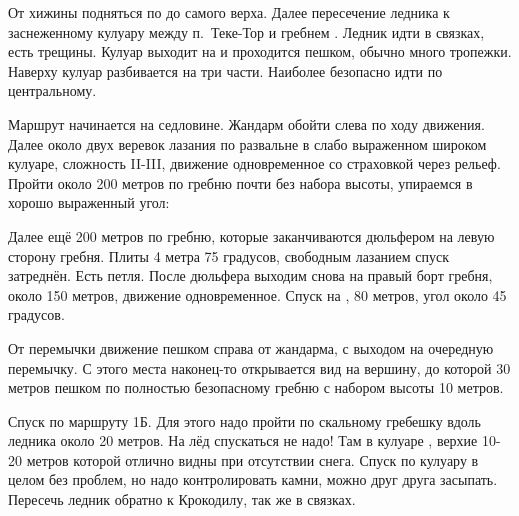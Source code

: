 От хижины \geoLighthouse подняться по 
до самого верха. Далее пересечение ледника к заснеженному кулуару
между п.~Теке-Тор и гребнем \geoPeakBoks. Ледник идти в связках, есть
трещины. Кулуар выходит на \geoPassTekeTor и проходится пешком, обычно
много тропежки. Наверху кулуар разбивается на три части. Наиболее
безопасно идти по центральному.

Маршрут начинается на седловине. Жандарм обойти слева по ходу
движения. Далее около двух веревок лазания по развальне в слабо
выраженном широком кулуаре, сложность II-III, движение одновременное
со страховкой через рельеф. Пройти около 200 метров по гребню почти
без набора высоты, упираемся в хорошо выраженный угол: 

Далее ещё 200 метров по гребню, которые заканчиваются дюльфером на
левую сторону гребня. Плиты 4 метра 75 градусов, свободным лазанием
спуск затреднён. Есть петля. После дюльфера выходим снова на правый
борт гребня, около 150 метров, движение одновременное. Спуск на
, 80 метров, угол около 45
градусов.

От перемычки движение пешком справа от жандарма, с выходом на
очередную перемычку. С этого места наконец-то открывается вид на
вершину, до которой 30 метров пешком по полностью безопасному гребню с
набором высоты 10 метров.

Спуск по маршруту 1Б. Для этого надо пройти по скальному гребешку
вдоль ледника около 20 метров. На лёд спускаться не надо! Там в
кулуаре ,
верхие 10-20 метров которой отлично видны при отсутствии снега. Спуск
по кулуару в целом без проблем, но надо контролировать камни, можно
друг друга засыпать. Пересечь ледник обратно к Крокодилу, так же в
связках.
